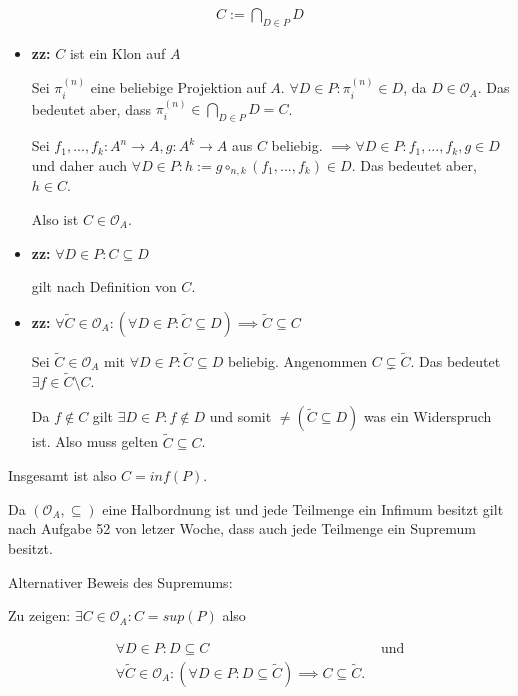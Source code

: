 \documentclass[]{article}
\begin{document}
\begin{align*}
	C:= \bigcap_{D\in P}D
\end{align*}

\begin{itemize}
	\item \textbf{zz: } $C$ ist ein Klon auf $A$
	
	Sei $\pi_i^{(n)}$ eine beliebige Projektion auf $A$. $\forall D \in P: \pi_i^{(n)} \in D$, da $D \in \mathcal{O}_A$. Das bedeutet aber, dass $\pi_i^{(n)} \in \bigcap_{D\in P}D = C$.
	
	Sei $f_1, ..., f_k : A^n \rightarrow A, g:A^k\rightarrow A$ aus $C$ beliebig. $\implies \forall D \in P: f_1, ..., f_k, g \in D$ und daher auch $\forall D \in P: h := g\circ_{n,k}(f_1, ..., f_k) \in D$. Das bedeutet aber, $h \in C$.
	
	Also ist $C \in \mathcal{O}_A$.
	
	\item \textbf{zz: } $\forall D \in P: C \subseteq D$
	
	gilt nach Definition von $C$.
	
	\item \textbf{zz: } $\forall \tilde{C} \in \mathcal{O}_A:(\forall D \in P: \tilde{C} \subseteq D) \implies \tilde{C} \subseteq C$
	
	Sei $\tilde{C} \in \mathcal{O}_A$ mit $\forall D \in P: \tilde{C} \subseteq D$ beliebig. Angenommen $C \subsetneq \tilde{C}$. Das bedeutet $\exists f \in \tilde{C}\setminus C$.
	
	Da $f \notin C$ gilt $\exists D \in P: f \notin D$ und somit $\neq (\tilde{C} \subseteq D)$ was ein Widerspruch ist. Also muss gelten $\tilde{C} \subseteq C$.
\end{itemize}

Insgesamt ist also $C = inf(P)$.

Da $(\mathcal{O}_A, \subseteq)$ eine Halbordnung ist und jede Teilmenge ein Infimum besitzt gilt nach Aufgabe 52 von letzer Woche, dass auch jede Teilmenge ein Supremum besitzt.

Alternativer Beweis des Supremums:

Zu zeigen: $\exists C \in \mathcal{O}_A: C = sup(P)$ also

\begin{align*}
	\forall D \in P: D \subseteq C & \text{ und}\\
	\forall \tilde{C} \in \mathcal{O}_A:(\forall D \in P: D \subseteq \tilde{C}) \implies C \subseteq \tilde{C}.
\end{align*}
\end{document}
